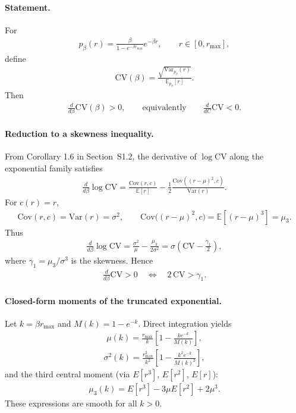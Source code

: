 \documentclass[11pt]{article}
\theoremstyle{remark}
\theoremstyle{definition}
\begin{document}
\paragraph{Statement.}
For
\begin{align}
p_\beta(r) = 
\frac{\beta}{1-e^{-\beta r_{\max}}}
e^{-\beta r}, \qquad r\in[0,r_{\max}],
\end{align}
define
\begin{align}
\mathrm{CV}(\beta)
= \frac{\sqrt{\mathrm{Var}_{p_\beta}(r)}}{\mathbb{E}_{p_\beta}[r]}.
\end{align}
Then
\begin{align}
\frac{d}{d\beta}\mathrm{CV}(\beta)>0,
\qquad\text{equivalently}\qquad
\frac{d}{dC}\mathrm{CV}<0.
\end{align}

\paragraph{Reduction to a skewness inequality.}

From Corollary 1.6 in Section~S1.2, the derivative of $\log\mathrm{CV}$
along the exponential family satisfies
\begin{align}
\frac{d}{d\beta}\log\mathrm{CV}
=
\frac{\mathrm{Cov}(r,c)}{\mathbb{E}[r]}
-
\frac{1}{2}\frac{
\mathrm{Cov}((r-\mu)^2,c)
}{
\mathrm{Var}(r)
}.
\end{align}
For $c(r)=r$,
\begin{align}
\mathrm{Cov}(r,c)=\mathrm{Var}(r)=\sigma^2,
\qquad
\mathrm{Cov}\!\big((r-\mu)^2,c\big)
=\mathbb{E}[(r-\mu)^3]=\mu_3.
\end{align}
Thus
\begin{align}
\frac{d}{d\beta}\log\mathrm{CV}
=
\frac{\sigma^2}{\mu}
-
\frac{\mu_3}{2\sigma^2}
=
\sigma\!\left(
\mathrm{CV}
-\frac{\gamma_1}{2}
\right),
\end{align}
where $\gamma_1=\mu_3/\sigma^3$ is the skewness.  Hence
\begin{align}
\frac{d}{d\beta}\mathrm{CV}>0
\quad\Longleftrightarrow\quad
2\,\mathrm{CV} > \gamma_1.
\label{eq:skew-cond}
\end{align}

\paragraph{Closed-form moments of the truncated exponential.}

Let $k=\beta r_{\max}$ and $M(k)=1-e^{-k}$.
Direct integration yields
\begin{align}
\mu(k)
= 
\frac{r_{\max}}{k}
\left[
1-\frac{k e^{-k}}{M(k)}
\right],
\end{align}
\begin{align}
\sigma^2(k)
=
\frac{r_{\max}^2}{k^2}
\left[
1 - \frac{k^2 e^{-k}}{M(k)^2}
\right],
\end{align}
and the third central moment (via $E[r^3]$, $E[r^2]$, $E[r]$):
\begin{align}
\mu_3(k)
=
E[r^3] - 3\mu E[r^2] + 2\mu^3.
\end{align}
These expressions are smooth for all $k>0$.
\end{document}
